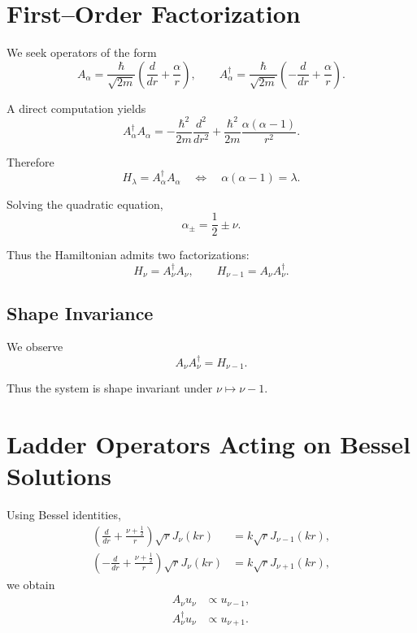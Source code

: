 \documentclass[11pt,a4paper]{article}
\begin{document}
\section{First–Order Factorization}

We seek operators of the form
\begin{equation}
A_\alpha
=
\frac{\hbar}{\sqrt{2m}}
\left(
\frac{d}{dr}+\frac{\alpha}{r}
\right),
\qquad
A_\alpha^\dagger
=
\frac{\hbar}{\sqrt{2m}}
\left(
-\frac{d}{dr}+\frac{\alpha}{r}
\right).
\end{equation}

A direct computation yields
\begin{equation}
A_\alpha^\dagger A_\alpha
=
-\frac{\hbar^2}{2m}\frac{d^2}{dr^2}
+
\frac{\hbar^2}{2m}\frac{\alpha(\alpha-1)}{r^2}.
\end{equation}

Therefore
\begin{equation}
H_\lambda = A_\alpha^\dagger A_\alpha
\quad \Longleftrightarrow \quad
\alpha(\alpha-1)=\lambda.
\end{equation}

Solving the quadratic equation,
\begin{equation}
\alpha_\pm = \frac12 \pm \nu.
\end{equation}

Thus the Hamiltonian admits two factorizations:
\begin{equation}
H_\nu
=
A_\nu^\dagger A_\nu,
\qquad
H_{\nu-1}
=
A_\nu A_\nu^\dagger.
\end{equation}

\subsection*{Shape Invariance}

We observe
\begin{equation}
A_\nu A_\nu^\dagger = H_{\nu-1}.
\end{equation}

Thus the system is shape invariant under
\(
\nu \mapsto \nu-1.
\)

\section{Ladder Operators Acting on Bessel Solutions}

Using Bessel identities,
\begin{align}
\left(
\frac{d}{dr}+\frac{\nu+\frac12}{r}
\right)
\sqrt{r}J_\nu(kr)
&=
k\sqrt{r}J_{\nu-1}(kr),\\
\left(
-\frac{d}{dr}+\frac{\nu+\frac12}{r}
\right)
\sqrt{r}J_\nu(kr)
&=
k\sqrt{r}J_{\nu+1}(kr),
\end{align}
we obtain
\begin{align}
A_\nu u_\nu &\propto u_{\nu-1},\\
A_\nu^\dagger u_\nu &\propto u_{\nu+1}.
\end{align}
\end{document}
